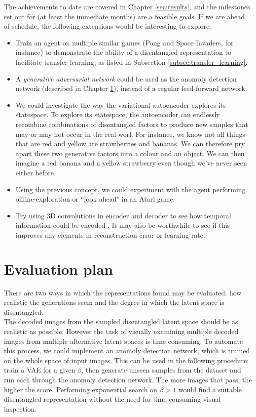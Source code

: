 \documentclass[12pt,twoside]{article}
\begin{document}
The achievements to date are covered in Chapter \ref{sec:results}, and the milestones set out for (at least the immediate months) are a feasible goals. If we are ahead of schedule, the following extensions would be interesting to explore:

\begin{itemize}
\item Train an agent on multiple similar games (Pong and Space Invaders, for instance) to demonstrate the ability of a disentangled representation to facilitate transfer learning, as listed in Subsection \ref{subsec:transfer_learning}.
\item A \textit{generative adversarial network} could be used as the anomoly detection network (described in Chapter \ref{sec:evaluation_plan}), instead of a regular feed-forward network.
\item We could investigate the way the variational autoencoder explores its statespace. To explore its statespace, the autoencoder can endlessly recombine combinations of disentangled factors to produce new samples that may or may not occur in the real worl. For instance, we know not all things that are red and yellow are strawberries and bananas. We can therefore pry apart these two generative factors into a colour and an object. We can then imagine a red banana and a yellow strawberry even though we've never seen either before.
\item Using the previous concept, we could experiment with the agent performing offline-exploration or ``look ahead" in an Atari game.
\item Try using 3D convolutions in encoder and decoder to see how temporal information could be encoded \cite{Ji2013}. It may also be worthwhile to see if this improves any elements in reconstruction error or learning rate. 
\end{itemize}



\newpage
\section{Evaluation plan}
\label{sec:evaluation_plan}
There are two ways in which the representations found may be evaluated: how realistic the generations seem and the degree in which the latent space is disentangled.\\

The decoded images from the sampled disentangled latent space should be as realistic as possible. However the task of visually examining multiple decoded images from multiple alternative latent spaces is time consuming. To automate this process, we could implement an anomoly detection network, which is trained on the whole space of input images. This can be used in the following procedure: train a VAE for a given $\beta$, then generate unseen samples from the dataset and run each through the anomoly detection network. The more images that pass, the higher the score. Performing exponential search on $\beta>1$ would find a suitable disentangled representation without the need for time-consuming visual inspection.\\
\end{document}
